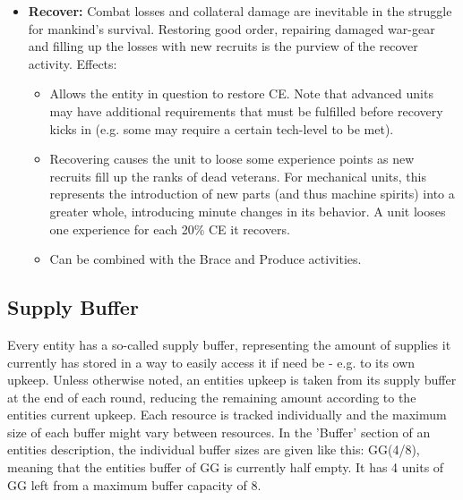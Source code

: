 \begin{itemize}
    \item \textbf{Recover:} Combat losses and collateral damage are inevitable in the struggle for mankind's survival. Restoring good order, repairing damaged war-gear and filling up the losses with new recruits is the purview of the recover activity.
    Effects:
    \begin{itemize}
        \item Allows the entity in question to restore CE. Note that advanced units may have additional requirements that must be fulfilled before recovery kicks in (e.g. some may require a certain tech-level to be met).
        \item Recovering causes the unit to loose some experience points as new recruits fill up the ranks of dead veterans. For mechanical units, this represents the introduction of new parts (and thus machine spirits) into a greater whole, introducing minute changes in its behavior. A unit looses one experience for each 20\% CE it recovers.
        \item Can be combined with the Brace and Produce activities.
    \end{itemize}   
\end{itemize}

\subsection{Supply Buffer}
Every entity has a so-called supply buffer, representing the amount of supplies it currently has stored in a way to easily access it if need be - e.g. to its own upkeep. Unless otherwise noted, an entities upkeep is taken from its supply buffer at the end of each round, reducing the remaining amount according to the entities current upkeep. Each resource is tracked individually and the maximum size of each buffer might vary between resources. In the 'Buffer' section of an entities description, the individual buffer sizes are given like this: GG(4/8), meaning that the entities buffer of GG is currently half empty. It has 4 units of GG left from a maximum buffer capacity of 8. 

